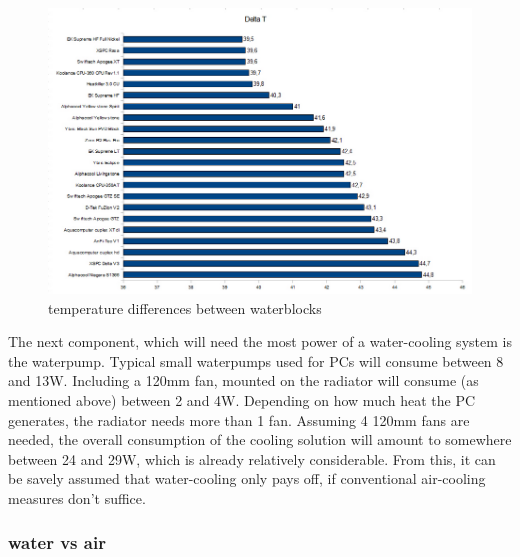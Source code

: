 \begin{figure}[H]
  \centering
  \includegraphics[width=.9\textwidth]{./graphics/waterblock_differences}
  \caption{temperature differences between waterblocks}
  \label{fig:waterblocks_diff}
\end{figure}
The next component, which will need the most power of a water-cooling system is the waterpump. Typical small waterpumps used for PCs will consume between 8 and 13W.
Including a 120mm fan, mounted on the radiator will consume (as mentioned above) between 2 and 4W. Depending on how much heat the PC generates, the radiator
needs more than 1 fan. Assuming 4 120mm fans are needed, the overall consumption of the cooling solution will amount to somewhere between 24 and 29W, which
is already relatively considerable. From this, it can be savely assumed that water-cooling only pays off, if conventional air-cooling measures don't suffice.

\subsubsection{water vs air}


